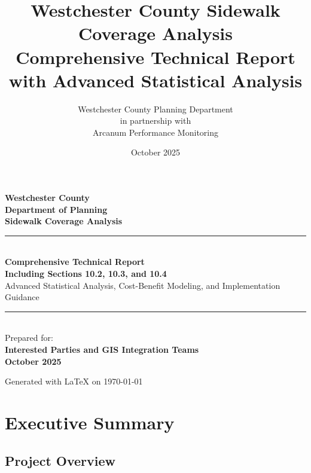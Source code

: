 \documentclass[11pt,letterpaper]{report}
\title{Westchester County Sidewalk Coverage Analysis\\
\large Comprehensive Technical Report with Advanced Statistical Analysis}
\author{Westchester County Planning Department\\
in partnership with\\
Arcanum Performance Monitoring}
\date{October 2025}
\begin{document}
\begin{titlepage}
    \centering
    \vspace*{2cm}

    {\Large\bfseries Westchester County}\\[0.5cm]
    {\large\bfseries Department of Planning}\\[0.5cm]
    {\large\bfseries Sidewalk Coverage Analysis}\\[1cm]

    \rule{\textwidth}{1.5pt}\\[0.5cm]
    {\huge\bfseries Comprehensive Technical Report}\\[0.3cm]
    {\Large\bfseries Including Sections 10.2, 10.3, and 10.4}\\[0.3cm]
    {\large Advanced Statistical Analysis, Cost-Benefit Modeling, and Implementation Guidance}\\[0.5cm]
    \rule{\textwidth}{1.5pt}\\[1cm]

    {\large Prepared for:}\\[0.3cm]
    {\large\bfseries Interested Parties and GIS Integration Teams}\\[1cm]

    {\large\bfseries October 2025}\\[1cm]


    \vfill
    {\small Generated with \LaTeX{} on \today}
\end{titlepage}

\tableofcontents
\newpage

\chapter{Executive Summary}

\section{Project Overview}
\end{document}
